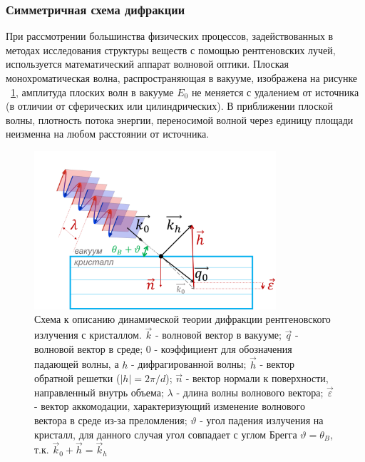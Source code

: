 \subsubsection{Симметричная схема дифракции}
  При рассмотрении большинства физических процессов, задействованных
  в методах исследования структуры веществ с помощью рентгеновских лучей,
  используется математический аппарат волновой оптики.
  Плоская монохроматическая волна, распространяющая в вакууме, изображена на рисунке ~\ref{ris:plane_wave_vacuum},
  амплитуда плоских волн в вакууме $E_0$ не меняется с удалением от
  источника (в отличии от сферических или цилиндрических). В приближении плоской волны,
  плотность потока энергии, переносимой волной через единицу площади неизменна на любом расстоянии от источника.

  \begin{figure}[H]
    \centering
    \includegraphics[width=0.8\textwidth]{images/plane_wave_vacuum.png}
    \caption{Схема к описанию динамической теории дифракции рентгеновского излучения с кристаллом.
      $\vec {k}$ - волновой вектор в вакууме; $\vec {q}$ - волновой вектор в среде;
     $0$ - коэффициент для обозначения падающей волны, а $h$ -  дифрагированной волны; $\vec{h}$ - вектор
     обратной решетки ($|h|=2\pi/d$); $\vec{n}$ - вектор нормали к поверхности, направленный внутрь объема;
     $\lambda$ - длина волны волнового вектора; $\vec{\varepsilon}$ - вектор аккомодации, характеризующий изменение
     волнового вектора в среде из-за преломления; $\vartheta$ - угол падения излучения на кристалл, для данного
     случая угол совпадает с углом Брегга $\vartheta = \theta_B$, т.к.  $\vec {k}_0 + \vec{h} = \vec {k}_h $}
    \label{ris:plane_wave_vacuum}
  \end{figure}

